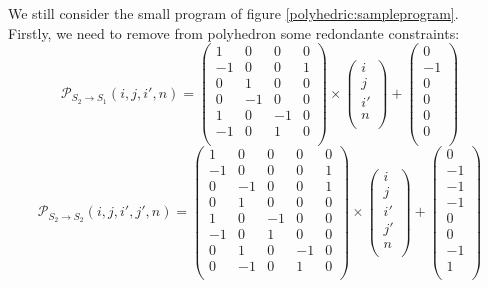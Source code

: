 	We still consider the small program of figure \ref{polyhedric:sampleprogram}.\\
	Firstly, we need to remove from polyhedron some redondante constraints:
$$\mathcal{P}_{S_{2} \rightarrow S_{1}}(i, j, i', n) = 
	\begin{pmatrix}
		1  & 0  & 0  & 0 \\
		-1 & 0  & 0  & 1 \\
		0  & 1  & 0  & 0 \\
		0  & -1 & 0  & 0 \\
		1  & 0  & -1 & 0 \\
		-1 & 0  & 1  & 0 \\
	\end{pmatrix}
	\times
	\begin{pmatrix}
		i  \\
		j  \\
		i' \\
		n  \\
	\end{pmatrix}
	+
	\begin{pmatrix}
		0  \\
		-1 \\
		0  \\
		0  \\
		0  \\
		0  \\
	\end{pmatrix}$$
$$\mathcal{P}_{S_{2} \rightarrow S_{2}}(i, j, i', j', n) = 
	\begin{pmatrix}
		1  & 0  & 0  & 0  & 0  \\
		-1 & 0  & 0  & 0  & 1  \\
		0  & -1 & 0  & 0  & 1  \\
		0  & 1  & 0  & 0  & 0  \\
		1  & 0  & -1 & 0  & 0  \\
		-1 & 0  & 1  & 0  & 0  \\
		0  & 1  & 0  & -1 & 0  \\
		0  & -1 & 0  & 1  & 0  \\
	\end{pmatrix}
	\times
	\begin{pmatrix}
		i  \\
		j  \\
		i' \\
		j' \\
		n  \\
	\end{pmatrix}
	+
	\begin{pmatrix}
		0  \\
		-1 \\
		-1 \\
		-1 \\
		0  \\
		0  \\
		-1 \\
		1  \\
	\end{pmatrix}$$
	
